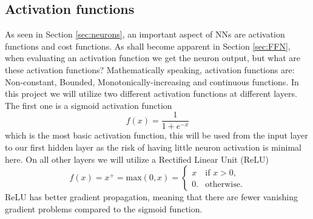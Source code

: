 \documentclass[12pt, a4paper]{book}
\begin{document}
\subsection{Activation functions}\label{sec:act}
As seen in Section \ref{sec:neurons}, an important aspect of NNs are activation functions and cost functions. As shall become apparent in Section \ref{sec:FFN}, when evaluating an activation function we get the neuron output, but what are these activation functions? 
Mathematically speaking, activation functions are: Non-constant, Bounded, Monotonically-increasing and continuous functions. In this project we will utilize two different activation functions at different layers. 
The first one is a sigmoid activation function
\begin{equation}\label{eq:sig}
    f(x) = \frac{1}{1+e^{-x}}
\end{equation}
which is the most basic activation function, this will be used from the input layer to our first hidden layer as the risk of having little neuron activation is minimal here. On all other layers we will utilize a Rectified Linear Unit (ReLU)
\begin{equation}\label{eq:ReLU}
    f(x) = x^+ = \text{max}(0,x) = \begin{cases}x&{\text{if }}x>0,\\0.&{\text{otherwise}}.\end{cases}
\end{equation}
ReLU has better gradient propagation, meaning that there are fewer vanishing gradient problems compared to the sigmoid function.
\end{document}
